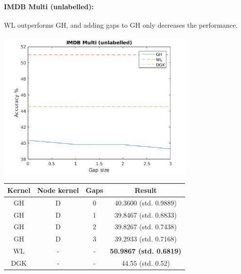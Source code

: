 \documentclass{article}
\begin{document}
\paragraph{IMDB Multi (unlabelled):}
WL outperforms GH, and adding gaps to GH only decreases the performance.\\
\begin{minipage}{0.6\linewidth}
	\hspace*{-1in}
	\includegraphics[width=10cm]{imdb_multi_unlabelled}
	\label{fig:imdb_multi_unlabelled}
\end{minipage}
\begin{minipage}[c]{0.5\linewidth}	
	\centering
	\begin{tabular}{c|c|c|c}
		Kernel & Node kernel & Gaps & Result\\
		\hline
		GH & D & 0 & 40.3600 (std. 0.9889) \\
		GH & D & 1 & 39.8467 (std. 0.8833) \\
		GH & D & 2 & 39.8267 (std. 0.7438) \\
		GH & D & 3 & 39.2933 (std. 0.7168) \\
		WL & - & - & \textbf{50.9867 (std. 0.6819)} \\
		DGK & - & - & 44.55 (std. 0.52) \\
	\end{tabular}
	\label{table:imdb_multi_unlabelled}
\end{minipage}
\end{document}
